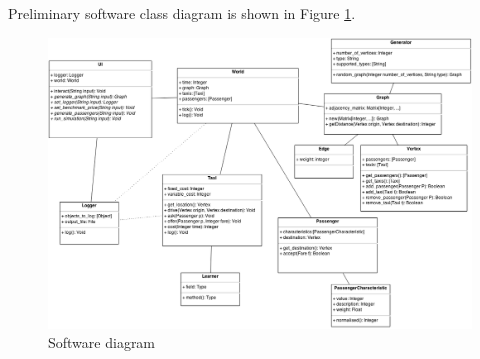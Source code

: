 Preliminary software class diagram is shown in Figure
\ref{figure:design:software}. 

\begin{figure}
  \begin{center}
    \includegraphics[width=\textwidth]{../figures/software_diagram}
    \caption{
      Software diagram
      \label{figure:design:software}
    }
  \end{center}
\end{figure}
